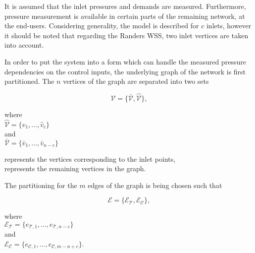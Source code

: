 It is assumed that the inlet pressures and demands are measured. Furthermore, pressure measurement is available in certain parts of the remaining network, at the end-users. Considering generality, the model is described for $c$ inlets, however it should be noted that regarding the Randers WSS, two inlet vertices are taken into account. 

In order to put the system into a form which can handle the measured pressure dependencies on the control inputs, the underlying graph of the network is first partitioned. The $n$ vertices of the graph are separated into two sets

\begin{equation}
  \label{vertices1}
  \mathcal{V} = \{\bar{\mathcal{V}}, \hat{\mathcal{V}} \}, 
\end{equation}

\begin{minipage}[t]{0.3\textwidth}
where\\
\hspace*{8mm} $\hat{\mathcal{V}} = \{\hat{v}_1, ..., \hat{v}_c\}$\\
\newline
and \\
\hspace*{8mm} $\bar{\mathcal{V}} = \{\bar{v}_1, ..., \bar{v}_{n-c}\}$ 
\end{minipage}
\begin{minipage}[t]{0.55\textwidth}
\vspace*{2mm}
 represents the vertices corresponding to the inlet points,\\
 \newline
 represents the remaining vertices in the graph.
\end{minipage}

The partitioning for the $m$ edges of the graph is being chosen such that

\begin{equation}
  \label{edges1}
  \mathcal{E} = \{\mathcal{E_{\mathcal{T}}}, \mathcal{E_{\mathcal{C}}} \},
\end{equation}

\begin{minipage}[t]{0.35\textwidth}
where\\
\hspace*{8mm} $\mathcal{E_{\mathcal{T}}} = \{e_{\mathcal{T},1}, ..., e_{\mathcal{T},n-c}\}$\\
and\\
\hspace*{8mm} $\mathcal{E_{\mathcal{C}}} = \{e_{\mathcal{C},1}, ..., e_{\mathcal{C},m-n+c}\}$. 
\end{minipage}

